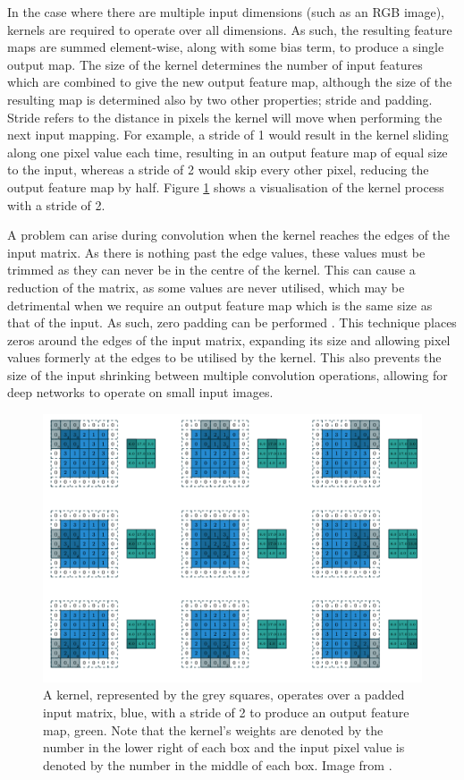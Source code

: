 In the case where there are multiple input dimensions (such as an RGB image), kernels are required to operate over all dimensions. As such, the resulting feature maps are summed element-wise, along with some bias term, to produce a single output map. The size of the kernel determines the number of input features which are combined to give the new output feature map, although the size of the resulting map is determined also by two other properties; stride and padding. Stride refers to the distance in pixels the kernel will move when performing the next input mapping. For example, a stride of 1 would result in the kernel sliding along one pixel value each time, resulting in an output feature map of equal size to the input, whereas a stride of 2 would skip every other pixel, reducing the output feature map by half. Figure \ref{fig:kernels} shows a visualisation of the kernel process with a stride of 2.

A problem can arise during convolution when the kernel reaches the edges of the input matrix. As there is nothing past the edge values, these values must be trimmed as they can never be in the centre of the kernel. This can cause a reduction of the matrix, as some values are never utilised, which may be detrimental when we require an output feature map which is the same size as that of the input. As such, zero padding can be performed \cite{albawi_understanding_2017}. This technique places zeros around the edges of the input matrix, expanding its size and allowing pixel values formerly at the edges to be utilised by the kernel. This also prevents the size of the input shrinking between multiple convolution operations, allowing for deep networks to operate on small input images. 

\begin{figure}
	\begin{center}
		\includegraphics[scale=0.45]{Chapter2/figs/kernel.png}
	\end{center}
	\caption{A kernel, represented by the grey squares, operates over a padded input matrix, blue, with a stride of 2 to produce an output feature map, green. Note that the kernel's weights are denoted by the number in the lower right of each box and the input pixel value is denoted by the number in the middle of each box. Image from \cite{dumoulin_160307285_2018}.}
	\label{fig:kernels}
\end{figure}


